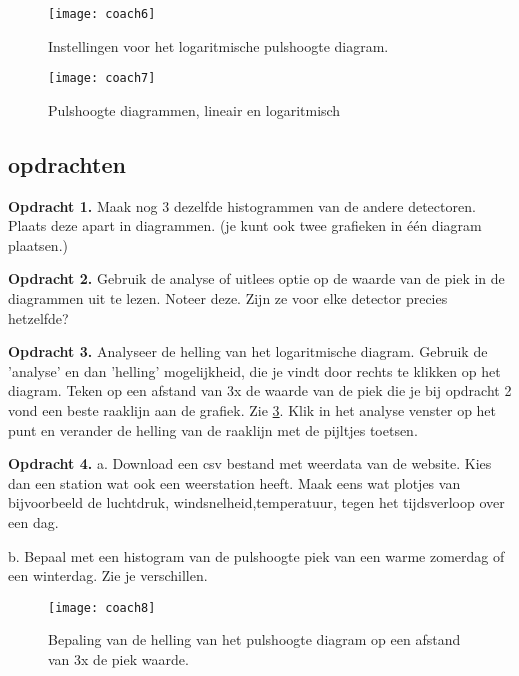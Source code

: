 \begin{figure}
    \centering
    \texttt{[image: coach6]}
    \caption{Instellingen voor het logaritmische pulshoogte diagram.}
    \label{fig:coach6}
\end{figure}

\begin{figure}
    \centering
    \texttt{[image: coach7]}
    \caption{Pulshoogte diagrammen, lineair en logaritmisch}
    \label{fig:coach7}
\end{figure}
 
 
\subsection{opdrachten} 

\textbf{Opdracht 1.}
Maak nog 3 dezelfde histogrammen van de andere detectoren. Plaats deze apart in diagrammen.
(je kunt ook twee grafieken in één diagram plaatsen.)

\textbf{Opdracht 2.}
Gebruik de analyse of uitlees optie op de waarde van de piek in de diagrammen
uit te lezen. Noteer deze. Zijn ze voor elke detector precies hetzelfde?

\textbf{Opdracht 3.}
Analyseer de helling van het logaritmische diagram. Gebruik de 'analyse' en dan 'helling'
mogelijkheid, die je vindt door rechts te klikken op het diagram. 
Teken op een afstand van 3x de waarde van de piek die je bij opdracht 2 vond een beste raaklijn aan de
grafiek. Zie \ref{fig:coach8}. Klik in het analyse venster op het punt en verander
de helling van de raaklijn met de pijltjes toetsen.

\textbf{Opdracht 4.}
a.
Download een csv bestand met weerdata van de \hisparc website.
Kies dan een \hisparc station wat ook een weerstation heeft.
Maak eens wat plotjes van bijvoorbeeld de luchtdruk, windsnelheid,temperatuur,
tegen het tijdsverloop over een dag.

b. Bepaal met een histogram van de pulshoogte piek van een warme zomerdag of 
een winterdag. Zie je verschillen. 

\begin{figure}
    \centering
    \texttt{[image: coach8]}
    \caption{Bepaling van de helling van het pulshoogte diagram op een afstand
    van 3x de piek waarde.}
    \label{fig:coach8}
\end{figure}







 


